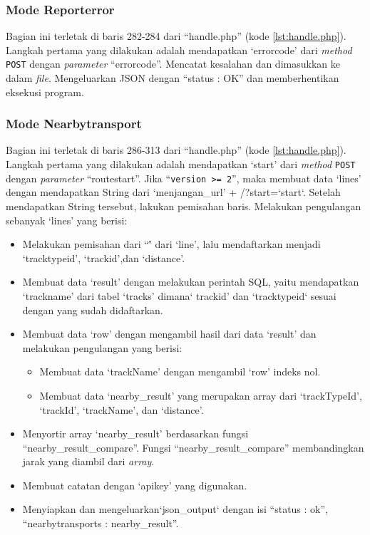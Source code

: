 \subsubsection{Mode Reporterror}
Bagian ini terletak di baris 282-284 dari ``handle.php'' (kode \ref{lst:handle.php}). Langkah pertama yang dilakukan adalah mendapatkan `errorcode' dari \textit{method} \verb!POST! dengan \textit{parameter} ``errorcode''. Mencatat kesalahan dan dimasukkan ke dalam \textit{file}. Mengeluarkan JSON dengan ``status : OK'' dan memberhentikan eksekusi program.

\subsubsection{Mode Nearbytransport}
Bagian ini terletak di baris 286-313 dari ``handle.php'' (kode \ref{lst:handle.php}). Langkah pertama yang dilakukan adalah mendapatkan `start' dari \textit{method} \verb!POST! dengan \textit{parameter} ``routestart''. Jika ``\texttt{version >= 2}'', maka membuat data `lines' dengan mendapatkan String dari `menjangan\_url' + /?start=`start`. Setelah mendapatkan String tersebut, lakukan pemisahan baris. Melakukan pengulangan sebanyak `lines' yang berisi:
\begin{itemize}
	\item Melakukan pemisahan dari ``\'' dari `line', lalu mendaftarkan menjadi  `tracktypeid', `trackid',dan `distance'.
	\item Membuat data `result' dengan melakukan perintah SQL, yaitu mendapatkan `trackname' dari tabel `tracks' dimana` trackid' dan `tracktypeid` sesuai dengan yang sudah didaftarkan.
	\item Membuat data `row' dengan mengambil hasil dari data `result' dan melakukan pengulangan yang berisi:
	\begin{itemize}
		\item Membuat data `trackName' dengan mengambil `row' indeks nol.
		\item Membuat data `nearby\_result' yang merupakan array dari `trackTypeId', `trackId', `trackName', dan `distance'.
	\end{itemize}
	\item Menyortir array `nearby\_result' berdasarkan fungsi ``nearby\_result\_compare''. Fungsi ``nearby\_result\_compare'' membandingkan jarak yang diambil dari \textit{array}.
	\item Membuat catatan dengan `apikey' yang digunakan.
	\item Menyiapkan dan mengeluarkan`json\_output` dengan isi ``status : ok'', ``nearbytransports : nearby\_result''.
	
\end{itemize}


